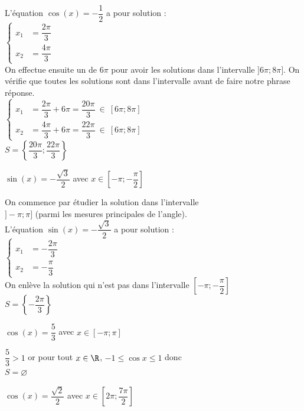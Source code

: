 \documentclass[11pt,a4paper]{article}  %
\begin{document}
\begin{enumMet}
\begin{corrBox}
		L'équation $\cos(x)=-\dfrac{1}{2}$ a pour solution :\\
		$\begin{cases}
			x_1 &=\dfrac{2\pi}{3}\\
			x_2 &=\dfrac{4\pi}{3}
		\end{cases}$\\
		On effectue ensuite un  de $6\pi$ pour avoir les solutions dans l'intervalle  $]6\pi;8\pi]$. On vérifie que toutes les solutions sont dans l'intervalle avant de faire notre phrase réponse.\\
		$\begin{cases}
			x_1 &=\dfrac{2\pi}{3}+6\pi=\dfrac{20\pi}{3}  \ \in\ [6\pi;8\pi] \\
			x_2 &=\dfrac{4\pi}{3}+6\pi=\dfrac{22\pi}{3} \ \in\ [6\pi;8\pi]
		\end{cases}$\\
		$S=\left\{\dfrac{20\pi}{3};\dfrac{22\pi}{3}\right\}$
	\end{corrBox}
	\item $\sin(x)=-\dfrac{\sqrt{3}}{2}$ avec $x\in \left[-\pi;-\dfrac{\pi}{2}\right]$\\
	\begin{corrBox}
		On commence par étudier la solution dans l'intervalle\\ $]-\pi;\pi]$ (parmi les mesures principales de l'angle).\\
		L'équation $\sin(x)=-\dfrac{\sqrt{3}}{2}$ a pour solution :\\
		$\begin{cases}
			x_1 &=-\dfrac{2\pi}{3}\\
			x_2 &=-\dfrac{\pi}{3}
		\end{cases}$\\
		On enlève la solution qui n'est pas dans l'intervalle $\left[-\pi;-\dfrac{\pi}{2}\right]$\\
		$S=\left\{-\dfrac{2\pi}{3}\right\}$
	\end{corrBox}
	\item $\cos(x)=\dfrac{5}{3}$ avec $x\in \left[-\pi;\pi\right]$\\
	\begin{corrBox}
		$\dfrac{5}{3}>1$ or pour tout $x \in \R$, $-1\leqslant \cos x\leqslant1$ donc\\
		$S=\varnothing$
	\end{corrBox}
	\newpage
	\item $\cos(x)=\dfrac{\sqrt{2}}{2}$ avec $x\in \left[2\pi;\dfrac{7\pi}{2}\right]$\\

\end{enumMet}
\end{document}
